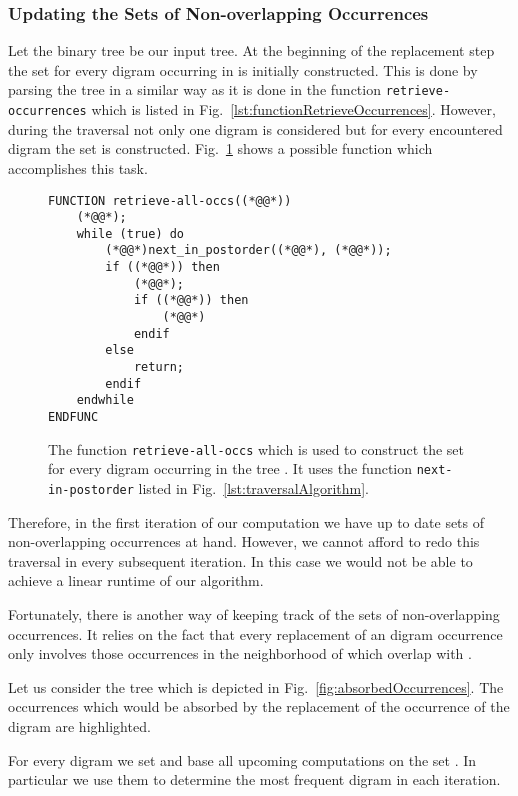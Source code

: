 \documentclass[12pt]{llncs}
\newcommand{\tp}{digram\xspace}
\begin{document}
\subsubsection{Updating the Sets of Non-overlapping Occurrences}

Let the binary tree  be our input tree. At the beginning of the replacement step the set  for every \tp  occurring in  is initially constructed. This is done by parsing the tree  in a similar way as it is done in the function \texttt{retrieve-occurrences} which is listed in Fig.~\ref{lst:functionRetrieveOccurrences}. However, during the traversal not only one \tp is considered but for every encountered \tp  the set  is constructed. Fig.~\ref{lst:functionRetrieveAllOccs} shows a possible function which accomplishes this task.
\begin{figure}[tb]
	\begin{lstlisting}
FUNCTION retrieve-all-occs((*@@*))
	(*@@*);
	while (true) do
		(*@@*)next_in_postorder((*@@*), (*@@*));
		if ((*@@*)) then
			(*@@*);
			if ((*@@*)) then
				(*@@*)
			endif
		else
			return;
		endif
	endwhile
ENDFUNC
	\end{lstlisting}
	\caption{The function \texttt{retrieve-all-occs} which is used to construct the set  for every \tp  occurring in the tree . It uses the function \texttt{next-in-postorder} listed in Fig.~\ref{lst:traversalAlgorithm}.}\label{lst:functionRetrieveAllOccs}
\end{figure}

Therefore, in the first iteration of our computation we have up to date sets of non-overlapping occurrences at hand. However, we cannot afford to redo this traversal in every subsequent iteration. In this case we would not be able to achieve a linear runtime of our algorithm.

Fortunately, there is another way of keeping track of the sets of non-overlapping occurrences. It relies on the fact that every replacement of an \tp occurrence  only involves those occurrences in the neighborhood of  which overlap with .
\begin{example}
	Let us consider the tree  which is depicted in Fig.~\ref{fig:absorbedOccurrences}. The occurrences which would be absorbed by the replacement of the occurrence  of the \tp  are highlighted.
\end{example}
For every \tp  we set  and base all upcoming computations on the set . In particular we use them to determine the most frequent \tp in each iteration. 
\end{document}
